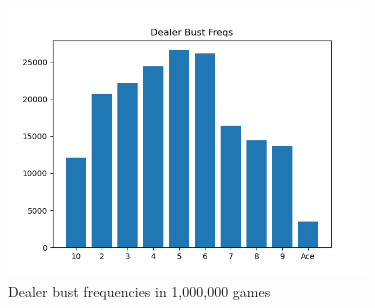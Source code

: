 \documentclass{article}
\begin{document}
		\begin{figure}
			\hypertarget{fig4}{}
			\begin{center}
				\includegraphics[width=9.5cm]{bustfreq.png}
				\caption{Dealer bust frequencies in 1,000,000 games}
			\end{center}
		\end{figure}
\end{document}
